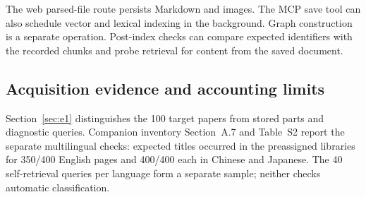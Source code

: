 The web parsed-file route persists Markdown and images. The MCP save tool
can also schedule vector and lexical indexing in the background. Graph
construction is a separate operation. Post-index checks can compare
expected identifiers with the recorded chunks and probe retrieval for
content from the saved document.

\subsection{Acquisition evidence and accounting limits}

Section~\ref{sec:e1} distinguishes the 100 target papers from stored parts
and diagnostic queries. Companion inventory Section~A.7 and Table~S2
report the separate multilingual checks: expected titles occurred in the
preassigned libraries for 350/400 English pages and 400/400 each in Chinese
and Japanese. The 40 self-retrieval queries per language form a separate
sample; neither checks automatic classification.
